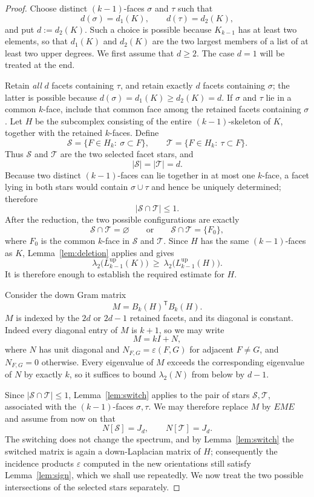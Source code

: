 \documentclass[11pt,reqno]{amsart}
\numberwithin{equation}{section}
\theoremstyle{plain}
\theoremstyle{definition}
\newcommand{\Lup}{L^{\mathrm{up}}}
\newcommand{\eps}{\varepsilon}
\newcommand{\T}{\mathsf{T}}
\newcommand{\Sset}{\mathcal S}
\newcommand{\Tset}{\mathcal T}
\begin{document}
\begin{proof}
Choose distinct $(k-1)$-faces $\sigma$ and $\tau$ such that
\[
  d(\sigma)=d_1(K),\qquad d(\tau)=d_2(K),
\]
and put $d:=d_2(K)$. Such a choice is possible because $K_{k-1}$ has at least two elements, so
that $d_1(K)$ and $d_2(K)$ are the two largest members of a list of at least two upper degrees.
We first assume that $d\ge2$. The case $d=1$ will be treated at the end. 

\medskip
\noindent

Retain \emph{all} $d$ facets containing $\tau$, and retain exactly $d$ facets containing
$\sigma$; the latter is possible because $d(\sigma)=d_1(K)\ge d_2(K)=d$. If $\sigma$ and $\tau$
lie in a common $k$-face, include that common face among the retained facets containing
$\sigma$. Let $H$ be the subcomplex consisting of the entire $(k-1)$-skeleton of $K$, together
with the retained $k$-faces. Define
\[
  \Sset=\{F\in H_k:\ \sigma\subset F\},\qquad \Tset=\{F\in H_k:\ \tau\subset F\} .
\]
Thus $\Sset$ and $\Tset$ are the two selected facet stars, and
\[
  |\Sset|=|\Tset|=d .
\]
Because two distinct $(k-1)$-faces can lie together in at most one $k$-face, a facet lying in
both stars would contain $\sigma\cup\tau$ and hence be uniquely determined; therefore
\[
  |\Sset\cap\Tset|\le1 .
\]
After the reduction, the two possible configurations are exactly
\[
  \Sset\cap\Tset=\varnothing \qquad\text{or}\qquad \Sset\cap\Tset=\{F_0\},
\]
where $F_0$ is the common $k$-face in $\Sset$ and $\Tset$. Since $H$ has the same $(k-1)$-faces
as $K$, Lemma~\ref{lem:deletion} applies and gives
\[
  \lambda_2\bigl(\Lup_{k-1}(K)\bigr)\ \ge\ \lambda_2\bigl(\Lup_{k-1}(H)\bigr) .
\]
It is therefore enough to establish the required estimate for $H$.

\medskip
\noindent

Consider the down Gram matrix
\[
  M={B_k(H)}^{\T}B_k(H) .
\]
 $M$ is
indexed by the $2d$ or $2d-1$ retained facets, and its diagonal is constant. Indeed every
diagonal entry of $M$ is $k+1$, so we may write
\[
  M=kI+N ,
\]
where $N$ has unit diagonal and $N_{F,G}=\eps(F,G)$ for adjacent $F\ne G$, and $N_{F,G}=0$
otherwise. Every eigenvalue of $M$ exceeds the corresponding eigenvalue of $N$ by exactly $k$,
so it suffices to bound $\lambda_2(N)$ from below by $d-1$.

Since $|\Sset\cap\Tset|\le1$, Lemma~\ref{lem:switch} applies to the pair of stars
$\Sset,\Tset$, associated with the $(k-1)$-faces $\sigma,\tau$. We may therefore replace $M$ by
$EME$ and assume from now on that
\[
  N[\Sset]=J_d,\qquad N[\Tset]=J_d .
\]
The switching does not change the spectrum, and by Lemma~\ref{lem:switch} the switched matrix
is again a down-Laplacian matrix of $H$; consequently the incidence
products $\eps$ computed in the new orientations still satisfy Lemma~\ref{lem:sign}, which we
shall use repeatedly. We now treat the two possible intersections of the selected stars
separately.


\end{proof}
\end{document}
